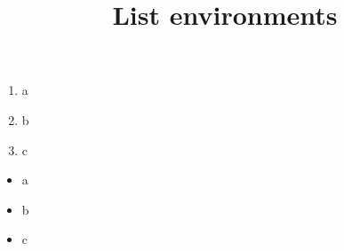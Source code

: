 \documentclass{article}
\title{List environments}
\begin{document}
\maketitle

\begin{enumerate}
\item a
\item b
\item c
\end{enumerate}

\bigskip

\begin{itemize}
\item a
\item b
\item c
\end{itemize}
\end{document}
